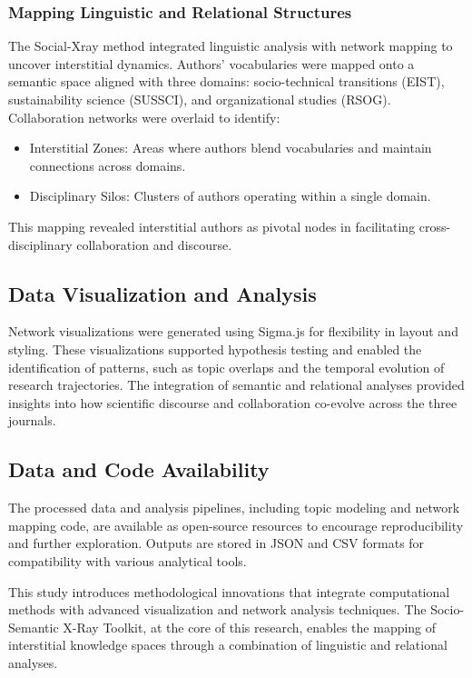 \documentclass[12pt]{article}
\begin{document}
\subsubsection{Mapping Linguistic and Relational Structures}
The Social-Xray method integrated linguistic analysis with network mapping to uncover interstitial dynamics. Authors’ vocabularies were mapped onto a semantic space aligned with three domains: socio-technical transitions (EIST), sustainability science (SUSSCI), and organizational studies (RSOG). Collaboration networks were overlaid to identify:
\begin{itemize}
    \item Interstitial Zones: Areas where authors blend vocabularies and maintain connections across domains.
    \item Disciplinary Silos: Clusters of authors operating within a single domain.
\end{itemize}

This mapping revealed interstitial authors as pivotal nodes in facilitating cross-disciplinary collaboration and discourse.

\subsection{Data Visualization and Analysis}
Network visualizations were generated using Sigma.js for flexibility in layout and styling. These visualizations supported hypothesis testing and enabled the identification of patterns, such as topic overlaps and the temporal evolution of research trajectories. The integration of semantic and relational analyses provided insights into how scientific discourse and collaboration co-evolve across the three journals.

\subsection{Data and Code Availability}
The processed data and analysis pipelines, including topic modeling and network mapping code, are available as open-source resources to encourage reproducibility and further exploration. Outputs are stored in JSON and CSV formats for compatibility with various analytical tools.

This study introduces methodological innovations that integrate computational methods with advanced visualization and network analysis techniques. The Socio-Semantic X-Ray Toolkit, at the core of this research, enables the mapping of interstitial knowledge spaces through a combination of linguistic and relational analyses.
\end{document}
